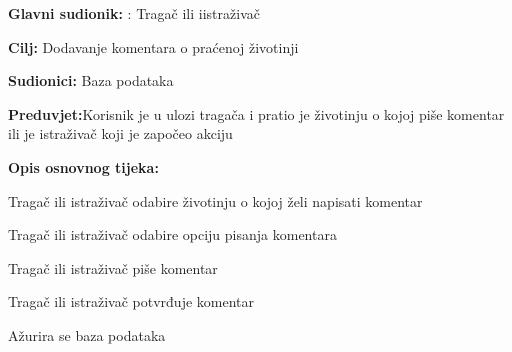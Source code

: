 					\noindent {}
					\begin{packed_item}
	
						\item \textbf{Glavni sudionik: }: Tragač ili iistraživač 
						\item  \textbf{Cilj:} Dodavanje komentara o praćenoj životinji
						\item  \textbf{Sudionici:} Baza podataka
						\item  \textbf{Preduvjet:}Korisnik je u ulozi tragača i pratio je životinju o kojoj piše komentar ili je istraživač koji je započeo akciju
						\item  \textbf{Opis osnovnog tijeka:}
						
						\item[] \begin{packed_enum}
	
							\item Tragač ili istraživač odabire životinju o kojoj želi napisati komentar
							\item Tragač ili istraživač odabire opciju pisanja komentara
							\item   Tragač ili istraživač piše komentar
							\item  Tragač ili istraživač potvrđuje komentar
							\item  Ažurira se baza podataka
							
						\end{packed_enum}
					\end{packed_item}
					\noindent {}
